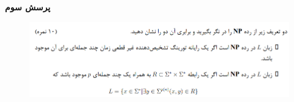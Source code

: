 \textbf{پرسش سوم}

\begin{figure}[H]
    \centering
    \includegraphics[scale=0.87]{questions/3.png}
\end{figure}
